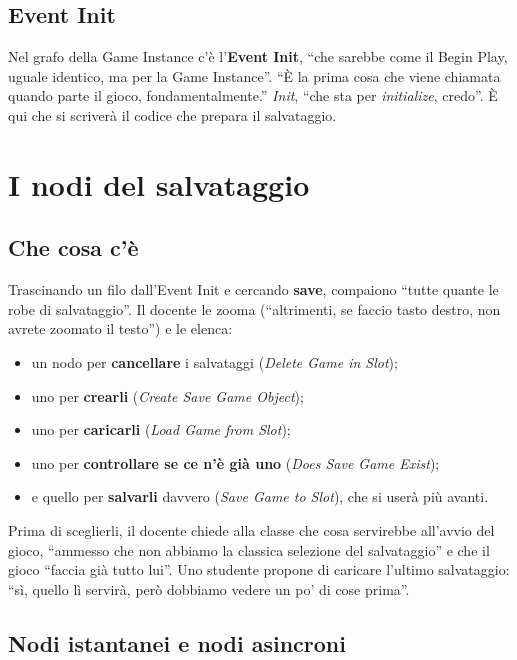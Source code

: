 \subsection{Event Init}

Nel grafo della Game Instance c'è l'\textbf{Event Init}, ``che sarebbe come
il Begin Play, uguale identico, ma per la Game Instance''. ``È la prima cosa
che viene chiamata quando parte il gioco, fondamentalmente.'' \emph{Init},
``che sta per \emph{initialize}, credo''. È qui che si scriverà il codice che
prepara il salvataggio.

\section{I nodi del salvataggio}
\label{gd16:sec:nodi}

\subsection{Che cosa c'è}

Trascinando un filo dall'Event Init e cercando \textbf{save}, compaiono
``tutte quante le robe di salvataggio''. Il docente le zooma (``altrimenti, se
faccio tasto destro, non avrete zoomato il testo'') e le elenca:
\begin{itemize}
  \item un nodo per \textbf{cancellare} i salvataggi (\emph{Delete Game in Slot});
  \item uno per \textbf{crearli} (\emph{Create Save Game Object});
  \item uno per \textbf{caricarli} (\emph{Load Game from Slot});
  \item uno per \textbf{controllare se ce n'è già uno} (\emph{Does Save Game
        Exist});
  \item e quello per \textbf{salvarli} davvero (\emph{Save Game to Slot}), che
        si userà più avanti.
\end{itemize}
Prima di sceglierli, il docente chiede alla classe che cosa servirebbe
all'avvio del gioco, ``ammesso che non abbiamo la classica selezione del
salvataggio'' e che il gioco ``faccia già tutto lui''. Uno studente propone di
caricare l'ultimo salvataggio: ``sì, quello lì servirà, però dobbiamo vedere un
po' di cose prima''.

\subsection{Nodi istantanei e nodi asincroni}

